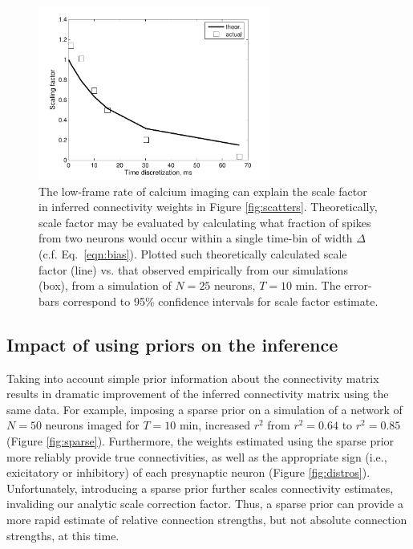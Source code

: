 \documentclass[aoas,preprint]{imsart}
\begin{document}
\begin{figure}[h]
\centering
\includegraphics[width=3in]{../figs/FigureA4_scale_bias}
\caption{The low-frame rate of calcium imaging can explain the scale factor in inferred connectivity weights in Figure \ref{fig:scatters}.  Theoretically, scale factor may be evaluated by calculating what fraction of spikes from two neurons would occur within a single time-bin of width $\Delta$ (c.f. Eq.~\eqref{eqn:bias}).  
Plotted such theoretically calculated scale factor (line) vs. that observed empirically from our simulations (box), from a simulation of $N=25$ neurons, $T=10$ min. The error-bars correspond to 95\% confidence intervals for scale factor estimate.}
\label{fig:bias}
\end{figure}

\subsection{Impact of using priors on the inference}

Taking into account simple prior information about the connectivity matrix results in dramatic improvement of the inferred connectivity matrix using the same data.%
For example, imposing a sparse prior on a simulation of a network of $N=50$ neurons imaged for $T=10$ min, increased $r^2$ from $r^2=0.64$ to $r^2=0.85$ (Figure \ref{fig:sparse}). Furthermore, the weights estimated using the sparse prior more reliably provide true connectivities, as well as the appropriate sign (i.e., exicitatory or inhibitory) of each presynaptic neuron (Figure \ref{fig:distros}). Unfortunately, introducing a sparse prior further scales connectivity estimates, invaliding our analytic scale correction factor.  Thus, a sparse prior can provide a more rapid estimate of relative connection strengths, but not absolute connection strengths, at this time. 
\end{document}
